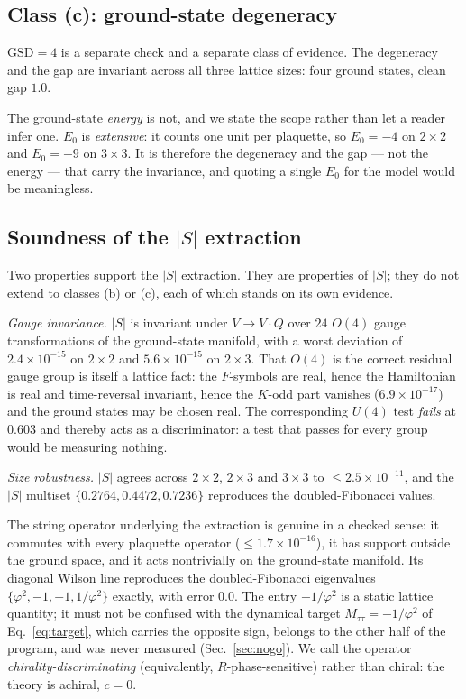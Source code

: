 \documentclass[aps,pra,twocolumn,superscriptaddress,longbibliography,floatfix,nofootinbib]{revtex4-2}
\begin{document}
\subsection{Class (c): ground-state degeneracy}
\label{sec:classc}

$\mathrm{GSD}=4$ is a separate check and a separate class of evidence. The
degeneracy and the gap are invariant across all three lattice sizes: four
ground states, clean gap $1.0$.

The ground-state \emph{energy} is not, and we state the scope rather than let a
reader infer one. $E_0$ is \emph{extensive}: it counts one unit per plaquette,
so $E_0=-4$ on $2\times2$ and $E_0=-9$ on $3\times3$. It is therefore the
degeneracy and the gap --- not the energy --- that carry the invariance, and
quoting a single $E_0$ for the model would be meaningless.

\subsection{Soundness of the $|S|$ extraction}
\label{sec:soundness}

Two properties support the $|S|$ extraction. They are properties of $|S|$; they
do not extend to classes (b) or (c), each of which stands on its own evidence.

\emph{Gauge invariance.} $|S|$ is invariant under $V\to V\cdot Q$ over $24$
$O(4)$ gauge transformations of the ground-state manifold, with a worst
deviation of $2.4\times10^{-15}$ on $2\times2$ and $5.6\times10^{-15}$ on
$2\times3$. That $O(4)$ is the correct residual gauge group is itself a
lattice fact: the $F$-symbols are real, hence the Hamiltonian is real and
time-reversal invariant, hence the $K$-odd part vanishes ($6.9\times10^{-17}$)
and the ground states may be chosen real. The corresponding $U(4)$ test
\emph{fails} at $0.603$ and thereby acts as a discriminator: a test that passes
for every group would be measuring nothing.

\emph{Size robustness.} $|S|$ agrees across $2\times2$, $2\times3$ and
$3\times3$ to $\le2.5\times10^{-11}$, and the $|S|$ multiset
$\{0.2764,0.4472,0.7236\}$ reproduces the doubled-Fibonacci values.

The string operator underlying the extraction is genuine in a checked sense:
it commutes with every plaquette operator ($\le1.7\times10^{-16}$), it has
support outside the ground space, and it acts nontrivially on the ground-state
manifold. Its diagonal Wilson line reproduces the doubled-Fibonacci eigenvalues
$\{\varphi^{2},-1,-1,1/\varphi^{2}\}$ exactly, with error $0.0$. The entry
$+1/\varphi^{2}$ is a static lattice quantity; it must not be confused with the
dynamical target $M_{\tau\tau}=-1/\varphi^{2}$ of Eq.~\eqref{eq:target}, which
carries the opposite sign, belongs to the other half of the program, and was
never measured (Sec.~\ref{sec:nogo}). We call the operator
\emph{chirality-discriminating} (equivalently, $R$-phase-sensitive) rather than
chiral: the theory is achiral, $c=0$.
\end{document}
